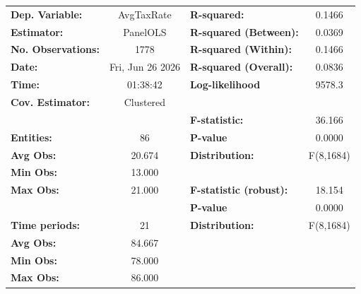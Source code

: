 \begin{center}
\begin{tabular}{lclc}
\toprule
\textbf{Dep. Variable:}                       &     AvgTaxRate     & \textbf{  R-squared:         }   &      0.1466      \\
\textbf{Estimator:}                           &      PanelOLS      & \textbf{  R-squared (Between):}  &      0.0369      \\
\textbf{No. Observations:}                    &        1778        & \textbf{  R-squared (Within):}   &      0.1466      \\
\textbf{Date:}                                &  Fri, Jun 26 2026  & \textbf{  R-squared (Overall):}  &      0.0836      \\
\textbf{Time:}                                &      01:38:42      & \textbf{  Log-likelihood     }   &      9578.3      \\
\textbf{Cov. Estimator:}                      &     Clustered      & \textbf{                     }   &                  \\
\textbf{}                                     &                    & \textbf{  F-statistic:       }   &      36.166      \\
\textbf{Entities:}                            &         86         & \textbf{  P-value            }   &      0.0000      \\
\textbf{Avg Obs:}                             &       20.674       & \textbf{  Distribution:      }   &    F(8,1684)     \\
\textbf{Min Obs:}                             &       13.000       & \textbf{                     }   &                  \\
\textbf{Max Obs:}                             &       21.000       & \textbf{  F-statistic (robust):} &      18.154      \\
\textbf{}                                     &                    & \textbf{  P-value            }   &      0.0000      \\
\textbf{Time periods:}                        &         21         & \textbf{  Distribution:      }   &    F(8,1684)     \\
\textbf{Avg Obs:}                             &       84.667       & \textbf{                     }   &                  \\
\textbf{Min Obs:}                             &       78.000       & \textbf{                     }   &                  \\
\textbf{Max Obs:}                             &       86.000       & \textbf{                     }   &                  \\

\end{tabular}
\end{center}
